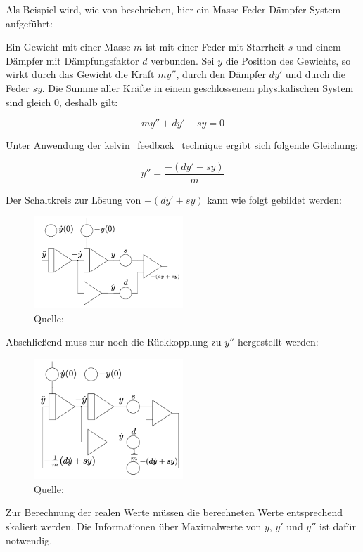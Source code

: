 Als Beispiel wird, wie von \cite[S. 168 ff.]{Ulmann2022} beschrieben, hier ein Masse-Feder-Dämpfer System aufgeführt:

Ein Gewicht mit einer Masse \(m\) ist mit einer Feder mit Starrheit \(s\) und einem Dämpfer mit Dämpfungsfaktor \(d\) verbunden. Sei \(y\) die Position des Gewichts, so wirkt durch das Gewicht die Kraft \(my''\), durch den Dämpfer \(dy'\) und durch die Feder \(sy\). Die Summe aller Kräfte in einem geschlossenem physikalischen System sind gleich 0, deshalb gilt:

\[my''+dy'+sy=0\]

Unter Anwendung der \gls{kelvin_feedback_technique} ergibt sich folgende Gleichung:

\[y''=\frac{-(dy'+sy)}{m}\]

Der Schaltkreis zur Lösung von \(-(dy'+sy)\) kann wie folgt gebildet werden:

\begin{figure}[h]
  \includegraphics[width=0.5\textwidth]{abbildungen/feder_masse_daempfer.png}
  \caption{Quelle: \cite[S. 170]{Ulmann2022}}
  \label{fig:Feder-Masse-Dämpfer System}
\end{figure}

Abschließend muss nur noch die Rückkopplung zu \(y''\) hergestellt werden:

\begin{figure}[h]
  \includegraphics[width=0.5\textwidth]{abbildungen/feder_masse_daempfer_mit_rueckkopplung.png}
  \caption{Quelle: \cite[S. 170]{Ulmann2022}}
  \label{fig:Feder-Masse-Dämpfer System mit Rückkopplung}
\end{figure}

Zur Berechnung der realen Werte müssen die berechneten Werte entsprechend skaliert werden. Die Informationen über Maximalwerte von \(y\), \(y'\) und \(y''\) ist dafür notwendig.
